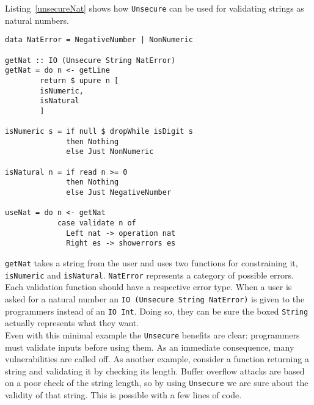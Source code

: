 Listing~\ref{unsecureNat} shows how \texttt{Unsecure} can be used for validating strings as natural numbers.
\begin{lstlisting}[label={unsecureNat}, breaklines=true, caption={Unsecure for natural numbers}]
data NatError = NegativeNumber | NonNumeric

getNat :: IO (Unsecure String NatError)
getNat = do n <- getLine
	    return $ upure n [
		isNumeric,
		isNatural
	    ]	   
	    
isNumeric s = if null $ dropWhile isDigit s
              then Nothing
              else Just NonNumeric

isNatural n = if read n >= 0
              then Nothing
              else Just NegativeNumber
              
useNat = do n <- getNat
            case validate n of
              Left nat -> operation nat
              Right es -> showerrors es
\end{lstlisting}
\texttt{getNat} takes a string from the user and uses two functions for constraining it, \texttt{isNumeric} and \texttt{isNatural}. \texttt{NatError} represents a category of possible errors. Each validation function should have a respective error type. When a user is asked for a natural number an \texttt{IO (Unsecure String NatError)} is given to the programmers instead of an \texttt{IO Int}. Doing so, they can be sure the boxed \texttt{String} actually represents what they want. \\
Even with this minimal example the \texttt{Unsecure} benefits are clear: programmers must validate inputs before using them. As an immediate consequence, many vulnerabilities are called off. As another example, consider a function returning a string and validating it by checking its length. Buffer overflow attacks are based on a poor check of the string length, so by using \texttt{Unsecure} we are sure about the validity of that string. This is possible with a few lines of code. 